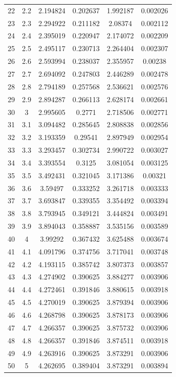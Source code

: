 \begin{table}[h]
{\begin{tabular}{cccccc}
  22     & 2.2  & 2.194824 & 0.202637 & 1.992187 & 0.002026 \\
  23     & 2.3  & 2.294922 & 0.211182 & 2.08374  & 0.002112 \\
  24     & 2.4  & 2.395019 & 0.220947 & 2.174072 & 0.002209 \\
  25     & 2.5  & 2.495117 & 0.230713 & 2.264404 & 0.002307 \\
  26     & 2.6  & 2.593994 & 0.238037 & 2.355957 & 0.00238  \\
  27     & 2.7  & 2.694092 & 0.247803 & 2.446289 & 0.002478 \\
  28     & 2.8  & 2.794189 & 0.257568 & 2.536621 & 0.002576 \\
  29     & 2.9  & 2.894287 & 0.266113 & 2.628174 & 0.002661 \\
  30     & 3    & 2.995605 & 0.2771   & 2.718506 & 0.002771 \\
  31     & 3.1  & 3.094482 & 0.285645 & 2.808838 & 0.002856 \\
  32     & 3.2  & 3.193359 & 0.29541  & 2.897949 & 0.002954 \\
  33     & 3.3  & 3.293457 & 0.302734 & 2.990722 & 0.003027 \\
  34     & 3.4  & 3.393554 & 0.3125   & 3.081054 & 0.003125 \\
  35     & 3.5  & 3.492431 & 0.321045 & 3.171386 & 0.00321  \\
  36     & 3.6  & 3.59497  & 0.333252 & 3.261718 & 0.003333 \\
  37     & 3.7  & 3.693847 & 0.339355 & 3.354492 & 0.003394 \\
  38     & 3.8  & 3.793945 & 0.349121 & 3.444824 & 0.003491 \\
  39     & 3.9  & 3.894043 & 0.358887 & 3.535156 & 0.003589 \\
  40     & 4    & 3.99292  & 0.367432 & 3.625488 & 0.003674 \\
  41     & 4.1  & 4.091796 & 0.374756 & 3.717041 & 0.003748 \\
  42     & 4.2  & 4.193115 & 0.385742 & 3.807373 & 0.003857 \\
  43     & 4.3  & 4.274902 & 0.390625 & 3.884277 & 0.003906 \\
  44     & 4.4  & 4.272461 & 0.391846 & 3.880615 & 0.003918 \\
  45     & 4.5  & 4.270019 & 0.390625 & 3.879394 & 0.003906 \\
  46     & 4.6  & 4.268798 & 0.390625 & 3.878173 & 0.003906 \\
  47     & 4.7  & 4.266357 & 0.390625 & 3.875732 & 0.003906 \\
  48     & 4.8  & 4.266357 & 0.391846 & 3.874511 & 0.003918 \\
  49     & 4.9  & 4.263916 & 0.390625 & 3.873291 & 0.003906 \\
  50     & 5    & 4.262695 & 0.389404 & 3.873291 & 0.003894 \\
\hline
\end{tabular}
}
\end{table}


